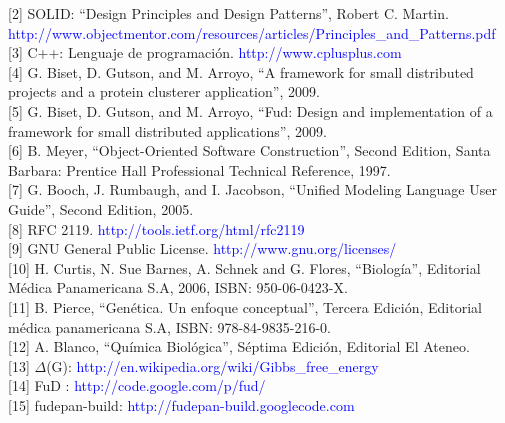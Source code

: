 \documentclass[12pt,a4paper,english,spanish]{article}
\begin{document}
[2] SOLID: ``Design Principles and Design Patterns'', Robert C. Martin. \textcolor{blue}{http://www.objectmentor.com/resources/articles/Principles\_and\_Patterns.pdf} \\

[3] C++: Lenguaje de programación. \textcolor{blue}{http://www.cplusplus.com} \\

[4] G. Biset, D. Gutson, and M. Arroyo, “A framework for small distributed projects and a protein clusterer application”, 2009. \\

[5] G. Biset, D. Gutson, and M. Arroyo, “Fud: Design and implementation of a framework for small distributed applications”, 2009. \\

[6] B. Meyer, “Object-Oriented Software Construction”, Second Edition, Santa Barbara: Prentice Hall Professional Technical Reference, 1997. \\

[7] G. Booch, J. Rumbaugh, and I. Jacobson, “Unified Modeling Language User Guide”, Second Edition, 2005. \\

[8] RFC 2119. \textcolor{blue}{http://tools.ietf.org/html/rfc2119} \\

[9] GNU General Public License. \textcolor{blue}{http://www.gnu.org/licenses/} \\

[10] H. Curtis, N. Sue Barnes, A. Schnek and G. Flores, “Biología”, Editorial Médica Panamericana S.A, 2006, ISBN: 950-06-0423-X. \\

[11] B. Pierce, “Genética. Un enfoque conceptual”, Tercera Edición, Editorial médica panamericana S.A, ISBN: 978-84-9835-216-0. \\

[12] A. Blanco, “Química Biológica”, Séptima Edición, Editorial El Ateneo. \\

[13] $\Delta$(G): \textcolor{blue}{http://en.wikipedia.org/wiki/Gibbs\_free\_energy} \\

[14] FuD : \textcolor{blue}{http://code.google.com/p/fud/} \\

[15] fudepan-build: \textcolor{blue}{http://fudepan-build.googlecode.com} \\
\end{document}
